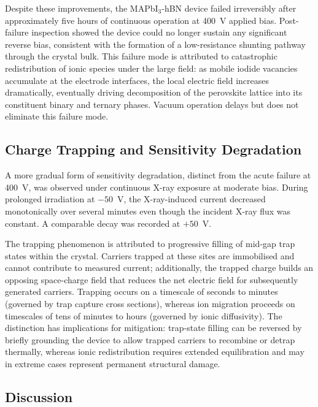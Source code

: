Despite these improvements, the MAPbI$_3$-hBN device failed
irreversibly after approximately five hours of continuous
operation at 400~V applied bias.  Post-failure inspection showed
the device could no longer sustain any significant reverse bias,
consistent with the formation of a low-resistance shunting pathway
through the crystal bulk.  This failure mode is attributed to
catastrophic redistribution of ionic species under the large
field: as mobile iodide vacancies accumulate at the electrode
interfaces, the local electric field increases dramatically,
eventually driving decomposition of the perovskite lattice into
its constituent binary and ternary phases.  Vacuum operation
delays but does not eliminate this failure mode.

\subsection{Charge Trapping and Sensitivity Degradation}
\label{sec:mapbi_trapping}

A more gradual form of sensitivity degradation, distinct from
the acute failure at 400~V, was observed under continuous
X-ray exposure at moderate bias.  During prolonged irradiation at
$-50$~V, the X-ray-induced current decreased monotonically over
several minutes even though the incident X-ray flux was constant.
A comparable decay was recorded at $+50$~V.

The trapping phenomenon is attributed to progressive filling of
mid-gap trap states within the crystal.  Carriers trapped at
these sites are immobilised and cannot contribute to measured
current; additionally, the trapped charge builds an opposing
space-charge field that reduces the net electric field for
subsequently generated carriers.  Trapping occurs on a timescale
of seconds to minutes (governed by trap capture cross sections),
whereas ion migration proceeds on timescales of tens of minutes
to hours (governed by ionic diffusivity).  The distinction has
implications for mitigation: trap-state filling can be reversed
by briefly grounding the device to allow trapped carriers to
recombine or detrap thermally, whereas ionic redistribution
requires extended equilibration and may in extreme cases represent
permanent structural damage.

\subsection{Discussion}
\label{sec:mapbi_discussion}

